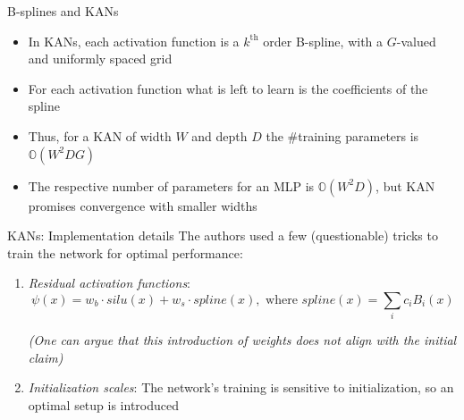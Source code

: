 \begin{frame}{B-splines and KANs}
    \begin{itemize}
        \item In KANs, each activation function is a $k^{\text{th}}$ order B-spline, with a $G$-valued and uniformly spaced grid  \vspace{0.5em}
        \item For each activation function what is left to learn is the coefficients of the spline \vspace{0.5em}
        \item Thus, for a KAN of width $W$ and depth $D$ the $\#$training parameters is $\mathbb{O}(W^2DG)$ \vspace{0.5em}
        \item The respective number of parameters for an MLP is $\mathbb{O}(W^2D)$, but KAN promises convergence with smaller widths \vspace{0.5em}
    \end{itemize}
\end{frame}

\begin{frame}{KANs: Implementation details}
    The authors used a few (questionable) tricks to train the network for optimal performance: \vspace{0.5em}
    \begin{enumerate}
        \item \textit{Residual activation functions}:
        $$\psi(x) = w_b\cdot silu(x) + w_s \cdot spline(x), \text{ where } spline(x) = \sum_i c_i B_i(x)$$
        \begin{center}
            \textit{\small \textcolor{blue!50!black}{(One can argue that this introduction of weights does not align with the initial claim)}} \vspace{1em}
        \end{center}
        \item \textit{Initialization scales}: The network's training is sensitive to initialization, so an optimal setup is introduced \vspace{1em}
    \end{enumerate}
\end{frame}

